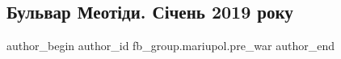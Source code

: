  
 
 
 
 

\subsection{Бульвар Меотіди. Січень 2019 року}
\label{sec:15_02_2023.fb.fb_group.mariupol.pre_war.6.bulvar_meot_di__s_ch}

\ifcmt
 author_begin
   author_id fb_group.mariupol.pre_war
 author_end
\fi
